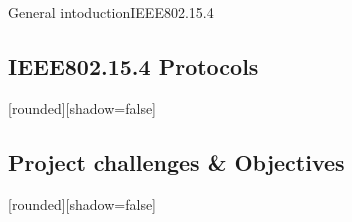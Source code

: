 \begin{withoutheadline}
\begin{frame}{General intoduction}{IEEE802.15.4}
\begin{minipage}[t]{0.48\linewidth}
\begin{figure}[p]
  
\end{figure}
\end{minipage}

   
    
    

\end{frame}
\end{withoutheadline}

\subsection{IEEE802.15.4 Protocols}

\begin{withoutheadline}
\begin{frame}


[rounded][shadow=false]




\end{frame}
\end{withoutheadline}

\subsection{Project challenges \& Objectives}


\begin{withoutheadline}
\begin{frame}


[rounded][shadow=false]




\end{frame}
\end{withoutheadline}
